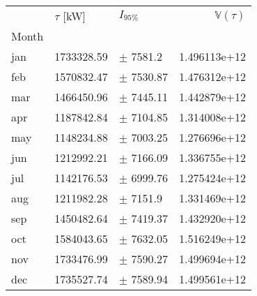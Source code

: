 \begin{tabular}{lllr}
\toprule
{} & $\tau$ [kW] &      $I_{95\%}$ &  $\mathbb{V}(\tau)$  \\
Month &             &                 &                      \\
\midrule
jan   &  1733328.59 &    $\pm$ 7581.2 &         1.496113e+12 \\
feb   &  1570832.47 &   $\pm$ 7530.87 &         1.476312e+12 \\
mar   &  1466450.96 &   $\pm$ 7445.11 &         1.442879e+12 \\
apr   &  1187842.84 &   $\pm$ 7104.85 &         1.314008e+12 \\
may   &  1148234.88 &   $\pm$ 7003.25 &         1.276696e+12 \\
jun   &  1212992.21 &   $\pm$ 7166.09 &         1.336755e+12 \\
jul   &  1142176.53 &   $\pm$ 6999.76 &         1.275424e+12 \\
aug   &  1211982.28 &    $\pm$ 7151.9 &         1.331469e+12 \\
sep   &  1450482.64 &   $\pm$ 7419.37 &         1.432920e+12 \\
oct   &  1584043.65 &   $\pm$ 7632.05 &         1.516249e+12 \\
nov   &  1733476.99 &   $\pm$ 7590.27 &         1.499694e+12 \\
dec   &  1735527.74 &   $\pm$ 7589.94 &         1.499561e+12 \\
\bottomrule
\end{tabular}
